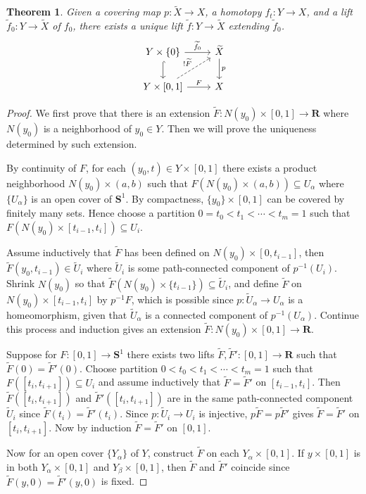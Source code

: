 \documentclass[11pt]{article}
\theoremstyle{definition}
\theoremstyle{plain}
\newtheorem{theorem}{Theorem}
\theoremstyle{remark}
\newcommand{\R}{\mathbf{R}}
\begin{document}
\begin{theorem}
Given a covering map $p:\widetilde{X}\to X$, a homotopy $f_t:Y\to X$, and a lift $\widetilde{f}_0:Y\to\widetilde{X}$ of $f_0$, there exists a unique lift $\widetilde{f}:Y\to\widetilde{X}$ extending $\widetilde{f}_0$.
\[\begin{tikzcd}
Y\times\{0\}\arrow{r}{\widetilde{f}_0}\arrow[hookrightarrow]{d}&\widetilde{X}\arrow{d}{p}\\
Y\times[0,1]\arrow{r}{F}\arrow[dashed]{ur}{!\widetilde{F}}&X
\end{tikzcd}\]
\end{theorem}
\begin{proof}
We first prove that there is an extension $\widetilde{F}:N(y_0)\times[0,1]\to\R$ where $N(y_0)$ is a neighborhood of $y_0\in Y$. Then we will prove the uniqueness determined by such extension.\medbreak

By continuity of $F$, for each $(y_0,t)\in Y\times[0,1]$ there exists a product neighborhood $N(y_0)\times(a,b)$ such that $F(N(y_0)\times(a,b))\subseteq U_\alpha$ where $\{U_\alpha\}$ is an open cover of $\mathbf{S}^1$. By compactness, $\{y_0\}\times[0,1]$ can be covered by finitely many sets. Hence choose a partition $0=t_0<t_1<\cdots<t_m=1$ such that $F(N(y_0)\times[t_{i-1},t_i])\subseteq U_i$.\medbreak

Assume inductively that $\widetilde{F}$ has been defined on $N(y_0)\times[0,t_{i-1}]$, then $\widetilde{F}(y_0,t_{i-1})\in\widetilde{U}_i$ where $\widetilde{U}_i$ is some path-connected component of $p^{-1}(U_i)$. Shrink $N(y_0)$ so that $\widetilde{F}(N(y_0)\times\{t_{i-1}\})\subseteq\widetilde{U}_i$, and define $\widetilde{F}$ on $N(y_0)\times[t_{i-1},t_i]$ by $p^{-1}F$, which is possible since $p:\widetilde{U}_\alpha\to U_\alpha$ is a homeomorphism, given that $\widetilde{U}_\alpha$ is a connected component of $p^{-1}(U_\alpha)$. Continue this process and induction gives an extension $\widetilde{F}:N(y_0)\times[0,1]\to\R$.\medbreak

Suppose for $F:[0,1]\to\mathbf{S}^1$ there exists two lifts $\widetilde{F},\widetilde{F}':[0,1]\to\R$ such that $\widetilde{F}(0)=\widetilde{F}'(0)$. Choose partition $0<t_0<t_1<\cdots<t_m=1$ such that $F([t_i,t_{i+1}])\subseteq U_i$ and assume inductively that $\widetilde{F}=\widetilde{F}'$ on $[t_{i-1},t_i]$. Then $\widetilde{F}([t_i,t_{i+1}])$ and $\widetilde{F}'([t_i,t_{i+1}])$ are in the same path-connected component $\widetilde{U}_i$ since $\widetilde{F}(t_i)=\widetilde{F}'(t_i)$. Since $p:\widetilde{U}_i\to U_i$ is injective, $p\widetilde{F}=p\widetilde{F}'$ gives $\widetilde{F}=\widetilde{F}'$ on $[t_i,t_{i+1}]$. Now by induction $\widetilde{F}=\widetilde{F}'$ on $[0,1]$.\medbreak

Now for an open cover $\{Y_\alpha\}$ of $Y$, construct $\widetilde{F}$ on each $Y_\alpha\times[0,1]$. If $y\times[0,1]$ is in both $Y_\alpha\times[0,1]$ and $Y_\beta\times[0,1]$, then $\widetilde{F}$ and $\widetilde{F}'$ coincide since $\widetilde{F}(y,0)=\widetilde{F}'(y,0)$ is fixed.
\end{proof}
\end{document}
